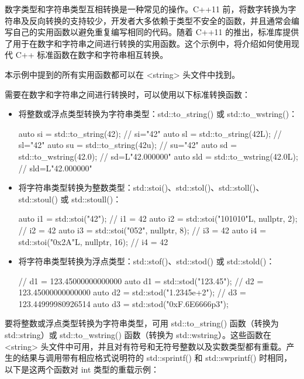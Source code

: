 
数字类型和字符串类型互相转换是一种常见的操作。C++11 前，将数字转换为字符串及反向转换的支持较少，开发者大多依赖于类型不安全的函数，并且通常会编写自己的实用函数以避免重复编写相同的代码。随着 C++11 的推出，标准库提供了用于在数字和字符串之间进行转换的实用函数。这个示例中，将介绍如何使用现代 C++ 标准函数在数字和字符串相互转换。


本示例中提到的所有实用函数都可以在 <string> 头文件中找到。


需要在数字和字符串之间进行转换时，可以使用以下标准转换函数：

\begin{itemize}
\item
将整数或浮点类型转换为字符串类型：std::to\_string() 或 std::to\_wstring()：

\begin{cpp}
auto si = std::to_string(42);      // si="42"
auto sl = std::to_string(42L);     // sl="42"
auto su = std::to_string(42u);     // su="42"
auto sd = std::to_wstring(42.0);   // sd=L"42.000000"
auto sld = std::to_wstring(42.0L); // sld=L"42.000000"
\end{cpp}

\item
将字符串类型转换为整数类型：std::stoi()、std::stol()、std::stoll()、std::stoul() 或 std::stoull()：

\begin{cpp}
auto i1 = std::stoi("42");                  // i1 = 42
auto i2 = std::stoi("101010"L, nullptr, 2); // i2 = 42
auto i3 = std::stoi("052", nullptr, 8);     // i3 = 42
auto i4 = std::stoi("0x2A"L, nullptr, 16);  // i4 = 42
\end{cpp}

\item
将字符串类型转换为浮点类型：std::stof()、std::stod() 或 std::stold()：

\begin{cpp}
// d1 = 123.45000000000000
auto d1 = std::stod("123.45");
// d2 = 123.45000000000000
auto d2 = std::stod("1.2345e+2");
// d3 = 123.44999980926514
auto d3 = std::stod("0xF.6E6666p3");
\end{cpp}
\end{itemize}


要将整数或浮点类型转换为字符串类型，可用 std::to\_string() 函数（转换为 std::string）或 std::to\_wstring() 函数（转换为 std::wstring）。这些函数在 <string> 头文件中可用，并且对有符号和无符号整数以及实数类型都有重载。产生的结果与调用带有相应格式说明符的 std::sprintf() 和 std::swprintf() 时相同，以下是这两个函数对 int 类型的重载示例：

